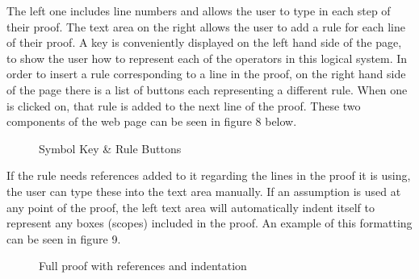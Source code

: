 The left one includes line numbers and allows the user to type in each step of their proof. The text area on the right allows the user to add a rule for each line of their proof. A key is conveniently displayed on the left hand side of the page, to show the user how to represent each of the operators in this logical system. In order to insert a rule corresponding to a line in the proof, on the right hand side of the page there is a list of buttons each representing a different rule. When one is clicked on, that rule is added to the next line of the proof. These two components of the web page can be seen in figure 8 below.

\begin{figure}[!ht]
	\centering
	\caption{Symbol Key \& Rule Buttons}
\end{figure}

If the rule needs references added to it regarding the lines in the proof it is using, the user can type these into the text area manually. If an assumption is used at any point of the proof, the left text area will automatically indent itself to represent any boxes (scopes) included in the proof. An example of this formatting can be seen in figure 9.

\begin{figure}[!ht]
	\centering
	\caption{Full proof with references and indentation}
\end{figure}


